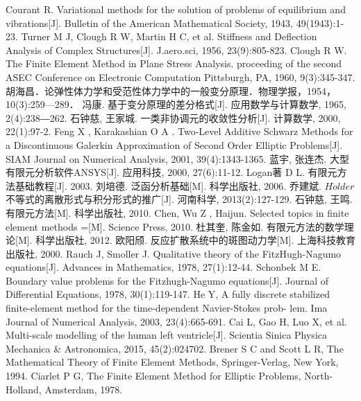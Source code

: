 \documentclass[twoside,UTF8]{nputhesis}
\begin{document}
\begin{thebibliography}{99}
	Courant R. Variational methods for the solution of problems of equilibrium and vibrations[J]. Bulletin of the American Mathematical Society, 1943, 49(1943):1-23.
	Turner M J, Clough R W, Martin H C, et al. Stiffness and Deflection Analysis of Complex Structures[J]. J.aero.sci, 1956, 23(9):805-823.
	Clough R W. The Finite Element Method in Plane Stress Analysis. proceeding of the second ASEC Conference on Electronic Computation Pittsburgh, PA, 1960, 9(3):345-347.
	胡海昌．论弹性体力学和受范性体力学中的一般变分原理．物理学报，1954，10(3):259—289．
	冯康. 基于变分原理的差分格式[J]. 应用数学与计算数学, 1965, 2(4):238―262.
	石钟慈, 王家城. 一类非协调元的收敛性分析[J]. 计算数学, 2000, 22(1):97-2.
	Feng X , Karakashian O A . Two-Level Additive Schwarz Methods for a Discontinuous Galerkin Approximation of Second Order Elliptic Problems[J]. SIAM Journal on Numerical Analysis, 2001, 39(4):1343-1365.
	蓝宇, 张连杰. 大型有限元分析软件ANSYS[J]. 应用科技, 2000, 27(6):11-12.
	Logan著 D L. 有限元方法基础教程[J]. 2003.
	刘培德. 泛函分析基础[M]. 科学出版社, 2006.
	乔建斌. $H\ddot{o}lder$不等式的离散形式与积分形式的推广[J]. 河南科学, 2013(2):127-129.
	石钟慈, 王鸣. 有限元方法[M]. 科学出版社, 2010.
	Chen, Wu Z , Haijun. Selected topics in finite element methods =[M]. Science Press, 2010.
	杜其奎, 陈金如. 有限元方法的数学理论[M]. 科学出版社, 2012.
	欧阳颀. 反应扩散系统中的斑图动力学[M]. 上海科技教育出版社, 2000.
	Rauch J, Smoller J. Qualitative theory of the FitzHugh-Nagumo equations[J]. Advances in Mathematics, 1978, 27(1):12-44.
	Schonbek M E. Boundary value problems for the Fitzhugh-Nagumo equations[J]. Journal of Differential Equations, 1978, 30(1):119-147.
	He Y, A fully discrete stabilized finite-element method for the time-dependent Navier-Stokes prob-
	lem. Ima Journal of Numerical Analysis, 2003, 23(4):665-691.
	Cai L, Gao H, Luo X, et al. Multi-scale modelling of the human left ventricle[J]. Scientia Sinica Physica Mechanica \& Astronomica, 2015, 45(2):024702.
	Brener S C and Scott L R, The Mathematical Theory of Finite Element Methods, Springer-Verlag, New York, 1994.
	Ciarlet P G, The Finite Element Method for Elliptic Problems, North-Holland, Amsterdam, 1978.
	

\end{thebibliography}
\end{document}
